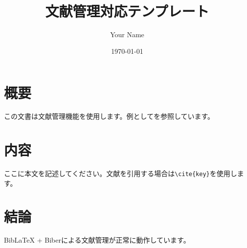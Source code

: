 \documentclass{ltjsarticle}
\title{文献管理対応テンプレート}
\author{Your Name}
\date{\today}
\begin{document}
\maketitle

\section*{概要}
この文書は文献管理機能を使用します。例として\cite{fujita2020}を参照しています。

\section*{内容}
ここに本文を記述してください。文献を引用する場合は\verb|\cite{key}|を使用します。

\section*{結論}
BibLaTeX + Biberによる文献管理が正常に動作しています。

\printbibliography[title=参考文献]
\end{document}
